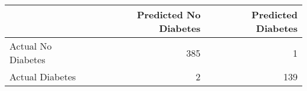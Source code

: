 \begin{tabular}{lrr}
\toprule
 & Predicted No Diabetes & Predicted Diabetes \\
\midrule
Actual No Diabetes & 385 & 1 \\
Actual Diabetes & 2 & 139 \\
\bottomrule
\end{tabular}
